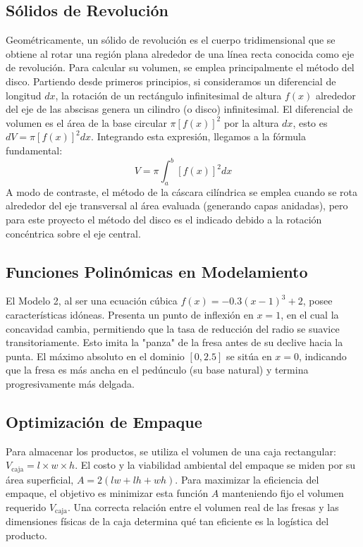 \documentclass[conference, Spanish]{IEEEtran}
\begin{document}
\subsection{Sólidos de Revolución}
Geométricamente, un sólido de revolución es el cuerpo tridimensional que se obtiene al rotar una región plana alrededor de una línea recta conocida como eje de revolución.
Para calcular su volumen, se emplea principalmente el método del disco. Partiendo desde primeros principios, si consideramos un diferencial de longitud $dx$, la rotación de un rectángulo infinitesimal de altura $f(x)$ alrededor del eje de las abscisas genera un cilindro (o disco) infinitesimal. El diferencial de volumen es el área de la base circular $\pi[f(x)]^2$ por la altura $dx$, esto es $dV = \pi[f(x)]^2dx$. Integrando esta expresión, llegamos a la fórmula fundamental:
\begin{equation}
V = \pi \int_{a}^{b} [f(x)]^2 dx
\end{equation}
A modo de contraste, el método de la cáscara cilíndrica se emplea cuando se rota alrededor del eje transversal al área evaluada (generando capas anidadas), pero para este proyecto el método del disco es el indicado debido a la rotación concéntrica sobre el eje central.

\subsection{Funciones Polinómicas en Modelamiento}
El Modelo 2, al ser una ecuación cúbica $f(x) = -0.3(x-1)^3 + 2$, posee características idóneas. Presenta un punto de inflexión en $x=1$, en el cual la concavidad cambia, permitiendo que la tasa de reducción del radio se suavice transitoriamente. Esto imita la "panza" de la fresa antes de su declive hacia la punta. El máximo absoluto en el dominio $[0, 2.5]$ se sitúa en $x=0$, indicando que la fresa es más ancha en el pedúnculo (su base natural) y termina progresivamente más delgada.

\subsection{Optimización de Empaque}
Para almacenar los productos, se utiliza el volumen de una caja rectangular: $V_{\text{caja}} = l \times w \times h$. El costo y la viabilidad ambiental del empaque se miden por su área superficial, $A = 2(lw + lh + wh)$. Para maximizar la eficiencia del empaque, el objetivo es minimizar esta función $A$ manteniendo fijo el volumen requerido $V_{\text{caja}}$. Una correcta relación entre el volumen real de las fresas y las dimensiones físicas de la caja determina qué tan eficiente es la logística del producto.
\end{document}
